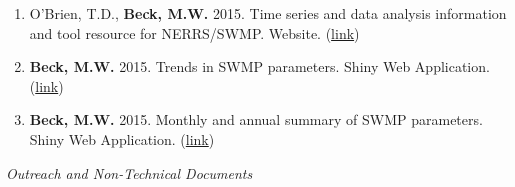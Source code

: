 \documentclass[letterpaper,12pt]{article}
\begin{document}
\begin{enumerate}
\item O'Brien, T.D., \textbf{Beck, M.W.} 2015. Time series and data analysis information and tool resource for NERRS/SWMP. Website. ({\footnotesize\href{http://swmprats.net/}{link}})

\item \textbf{Beck, M.W.} 2015. Trends in SWMP parameters. Shiny Web Application. ({\footnotesize\href{http://beckmw.shinyapps.io/swmp_comp/}{link}})

\item \textbf{Beck, M.W.} 2015. Monthly and annual summary of SWMP parameters. Shiny Web Application. ({\footnotesize\href{http://beckmw.shinyapps.io/swmp_summary/}{link}})

\end{enumerate}

\vspace{\baselineskip} 
\centerline{\large{\textit{Outreach and Non-Technical Documents}}}
\end{document}

